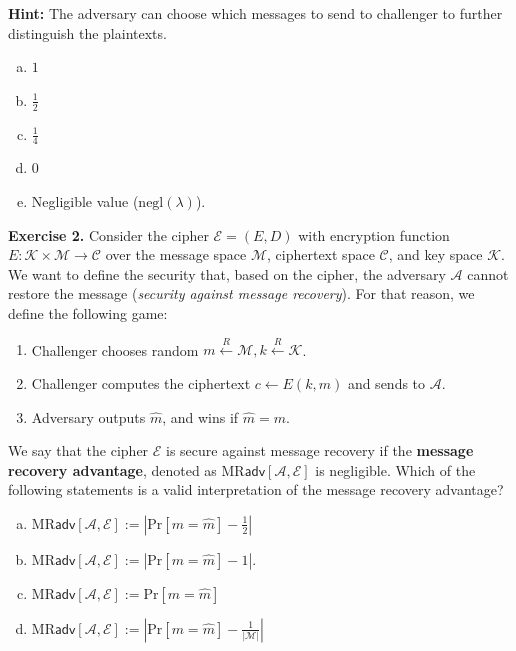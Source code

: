 \documentclass[../lecture-notes.tex]{subfiles}
\begin{document}
\textbf{Hint:} The adversary can choose which messages to send to challenger to further distinguish the plaintexts.

\begin{enumerate}[a)]
    \item $1$
    \item $\frac{1}{2}$
    \item $\frac{1}{4}$
    \item $0$
    \item Negligible value ($\text{negl}(\lambda)$).
\end{enumerate}

\textbf{Exercise 2.} Consider the cipher $\mathcal{E} = (E,D)$ with encryption function $E: \mathcal{K} \times \mathcal{M} \to \mathcal{C}$ over the message space $\mathcal{M}$, ciphertext space $\mathcal{C}$, and key space $\mathcal{K}$. We want to define the security
that, based on the cipher, the adversary $\mathcal{A}$ cannot restore the message (\textit{security against message recovery}). For that reason, we define the following game:
\begin{enumerate}
    \item Challenger chooses random $m \xleftarrow{R} \mathcal{M}, k \xleftarrow{R} \mathcal{K}$.
    \item Challenger computes the ciphertext $c \gets E(k,m)$ and sends to $\mathcal{A}$.
    \item Adversary outputs $\hat{m}$, and wins if $\hat{m} = m$.
\end{enumerate}

We say that the cipher $\mathcal{E}$ is secure against message recovery if the \textbf{message recovery advantage}, denoted as $\text{MR}\textsf{adv}[\mathcal{A}, \mathcal{E}]$ is negligible. Which of the following statements is a valid interpretation of the message recovery advantage?
\begin{enumerate}[a)]
    \item $\text{MR}\textsf{adv}[\mathcal{A},\mathcal{E}] := \left|\text{Pr}[m=\hat{m}] - \frac{1}{2}\right|$
    \item $\text{MR}\textsf{adv}[\mathcal{A},\mathcal{E}] := \left|\text{Pr}[m=\hat{m}] - 1\right|$.
    \item $\text{MR}\textsf{adv}[\mathcal{A},\mathcal{E}] := \text{Pr}[m=\hat{m}]$
    \item $\text{MR}\textsf{adv}[\mathcal{A},\mathcal{E}] := \left|\text{Pr}[m=\hat{m}] - \frac{1}{|\mathcal{M}|}\right|$
\end{enumerate}
\end{document}
